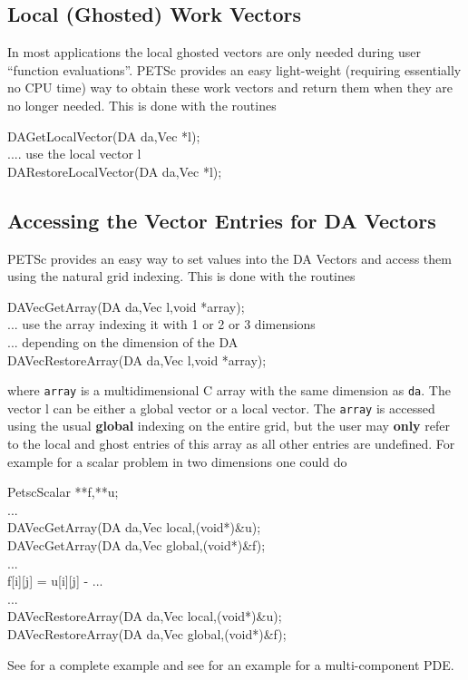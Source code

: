 \subsection{Local (Ghosted) Work Vectors}
In most applications the local ghosted vectors are only needed during user
``function evaluations''. PETSc provides an easy light-weight (requiring 
essentially no CPU time) way to obtain these work vectors and return them when
they are no longer needed. This is done with the routines
\begin{tabbing}
  DAGetLocalVector(DA da,Vec *l);\\
   .... use the local vector l\\
  DARestoreLocalVector(DA da,Vec *l);
\end{tabbing}

\subsection{Accessing the Vector Entries for DA Vectors}
PETSc provides an easy way to set values into the DA Vectors and access them using
the natural grid indexing. This is done with the routines 
\begin{tabbing}
  DAVecGetArray(DA da,Vec l,void *array);\\
   ... use the array indexing it with 1 or 2 or 3 dimensions \\
   ... depending on the dimension of the DA\\
  DAVecRestoreArray(DA da,Vec l,void *array);
\end{tabbing}
where {\tt array} is a multidimensional C array with the same dimension as
{\tt da}. The vector l can be either a global vector or a local vector.
The {\tt array} is accessed using the usual {\bf global} indexing
on the entire grid, but the user may {\bf only} refer to the local and ghost
entries of this array as all other entries are undefined. For example for a
scalar problem in two dimensions one could do
\begin{tabbing}
   PetscScalar **f,**u;\\
   ...\\
  DAVecGetArray(DA da,Vec local,(void*)\&u);\\
  DAVecGetArray(DA da,Vec global,(void*)\&f);\\
   ...\\
      f[i][j] = u[i][j] - ...\\
   ...\\
  DAVecRestoreArray(DA da,Vec local,(void*)\&u);\\
  DAVecRestoreArray(DA da,Vec global,(void*)\&f);
\end{tabbing}
See  for a 
complete example and see  for an
example for a multi-component PDE.


